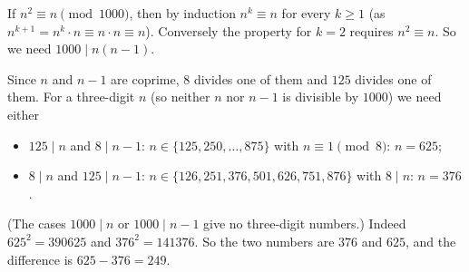 If $n^2\equiv n\pmod{1000}$, then by induction $n^k\equiv n$ for every $k\ge1$ (as $n^{k+1}=n^k\cdot n\equiv n\cdot n\equiv n$). Conversely the property for $k=2$ requires $n^2\equiv n$. So we need $1000\mid n(n-1)$.

Since $n$ and $n-1$ are coprime, $8$ divides one of them and $125$ divides one of them. For a three-digit $n$ (so neither $n$ nor $n-1$ is divisible by $1000$) we need either
\begin{itemize}
\item $125\mid n$ and $8\mid n-1$: $n\in\{125,250,\dots,875\}$ with $n\equiv1\pmod8$: $n=625$;
\item $8\mid n$ and $125\mid n-1$: $n\in\{126,251,376,501,626,751,876\}$ with $8\mid n$: $n=376$.
\end{itemize}
(The cases $1000\mid n$ or $1000\mid n-1$ give no three-digit numbers.) Indeed $625^2=390625$ and $376^2=141376$. So the two numbers are $376$ and $625$, and the difference is $625-376=\boxed{249}$.
